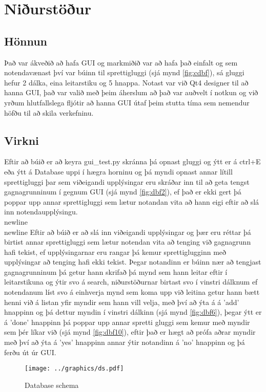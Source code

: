 \documentclass[12pt, git, final]{rureport}
\begin{document}
\section{Niðurstöður}\label{nidurstodur}
\subsection{Hönnun}
Það var ákveðið að hafa GUI og markmiðið var að hafa það einfalt og sem notendavænast því var búinn til sprettigluggi (sjá mynd \ref{fig:cdbf}), sá gluggi hefur 2 dálka, eina leitarstiku og 5 hnappa. Notast var við Qt4 designer til að hanna GUI, það var valið með þeim áherslum að það var auðvelt í notkun og við yrðum hlutfallslega fljótir að hanna GUI útaf þeim stutta tíma sem nemendur höfðu til að skila verkefninu.
\subsection {Virkni}
Eftir að búið er að keyra gui\_test.py skránna þá opnast gluggi og ýtt er á ctrl+E eða ýtt á Database uppi í hægra horninu og þá myndi opnast annar lítill sprettigluggi þar sem viðeigandi upplýsingar eru skráðar inn til að geta tengst gagnagrunninum í gegnum GUI (sjá mynd \ref{fig:dbf2}), ef það er ekki gert þá poppar upp annar sprettigluggi sem lætur notandan vita að hann eigi eftir að slá inn notendaupplýsingu.
\\newline
\\newline
Eftir að búið er að slá inn viðeigandi upplýsingar og þær eru réttar þá birtist annar sprettigluggi sem lætur notendan vita að tenging við gagnagrunn hafi tekist, ef upplýsingarnar eru rangar þá kemur sprettiglugginn með upplýsingar að tenging hafi ekki tekist.
\newline
\newline
Þegar notandinn er búinn nær að tengjast gagnagrunninum þá getur hann skrifað þá mynd sem hann leitar eftir í leitarstikuna og ýtir svo á search, niðurstöðurnar birtast svo í vinstri dálknum ef notendanum líst svo á einhverja mynd sem koma upp við leitina  getur hann bætt henni við á listan yfir myndir sem hann vill velja, með því að ýta á á 'add' hnappinn og þá dettur myndin í vinstri dálkinn (sjá mynd \ref{fig:dbf6}), þegar ýtt er á 'done' hnappinn þá poppar upp annar spretti gluggi sem kemur með myndir sem þér líkar við (sjá mynd \ref{fig:dbf10}), eftir það er hægt að prófa aðrar myndir með því að ýta á 'yes' hnappinn annar ýtir notandinn á 'no' hnappinn og þá ferðu út úr GUI.

\pagebreak
\begin{figure}
	\centering 
	\texttt{[image: ../graphics/ds.pdf]}
	\caption{Database schema \label{fig:dataschema}}
\end{figure}
\end{document}
